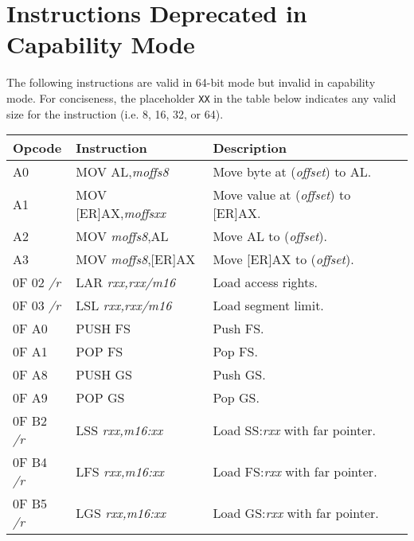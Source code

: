 \clearpage
\section{Instructions Deprecated in Capability Mode}

The following instructions are valid in 64-bit mode but invalid in
capability mode.  For conciseness, the placeholder \texttt{XX} in the
table below indicates any valid size for the instruction (i.e. 8, 16, 32,
or 64).

\bigskip
\noindent
\begin{tabularx}{\textwidth}{| l | l | Z |} \hline
  \textbf{Opcode} & \textbf{Instruction} &
  \textbf{Description}\\
  \hline
  A0 & MOV AL,\emph{moffs8} & Move byte at (\emph{offset}) to AL.\\
  \hline
  A1 & MOV [ER]AX,\emph{moffsxx} & Move value at (\emph{offset}) to [ER]AX.\\
  \hline
  A2 & MOV \emph{moffs8},AL & Move AL to  (\emph{offset}).\\
  \hline
  A3 & MOV \emph{moffs8},[ER]AX & Move [ER]AX to  (\emph{offset}).\\
  \hline
  0F 02 \emph{/r} & LAR \emph{rxx,rxx/m16} &
  Load access rights.\\
  \hline
  0F 03 \emph{/r} & LSL \emph{rxx,rxx/m16} &
  Load segment limit.\\
  \hline
  0F A0 & PUSH FS & Push FS.\\
  \hline
  0F A1 & POP FS & Pop FS.\\
  \hline
  0F A8 & PUSH GS & Push GS.\\
  \hline
  0F A9 & POP GS & Pop GS.\\
  \hline
  0F B2 \emph{/r} & LSS \emph{rxx,m16:xx} &
  Load SS:\emph{rxx} with far pointer.\\
  \hline
  0F B4 \emph{/r} & LFS \emph{rxx,m16:xx} &
  Load FS:\emph{rxx} with far pointer.\\
  \hline
  0F B5 \emph{/r} & LGS \emph{rxx,m16:xx} &
  Load GS:\emph{rxx} with far pointer.\\
  \hline
\end{tabularx}
